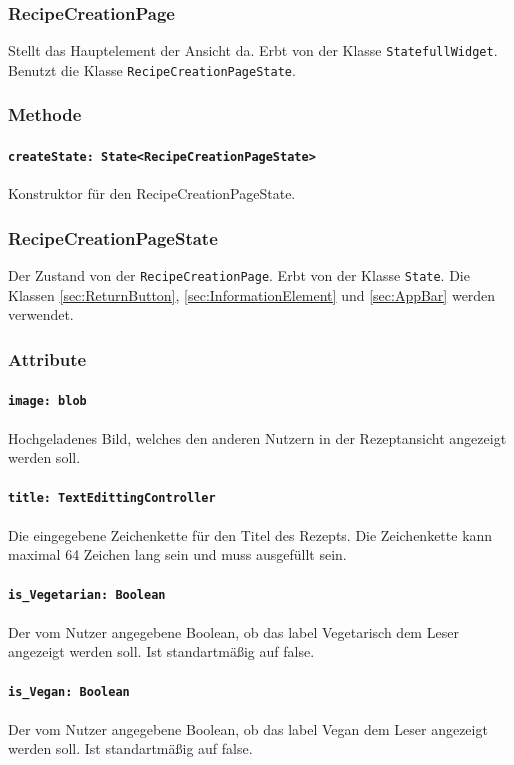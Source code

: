 \documentclass[parskip=full]{scrartcl}
\begin{document}
    \subsubsection{RecipeCreationPage}
    Stellt das Hauptelement der Ansicht da. Erbt von der Klasse \texttt{StatefullWidget}. Benutzt die Klasse \texttt{RecipeCreationPageState}.
        \subsubsection*{Methode}
            \paragraph*{\texttt{createState: State<RecipeCreationPageState>}} Konstruktor für den RecipeCreationPageState.

    \subsubsection{RecipeCreationPageState}
    Der Zustand von der \texttt{RecipeCreationPage}. Erbt von der Klasse \texttt{State}. Die Klassen \ref{sec:ReturnButton}, \ref{sec:InformationElement} und \ref{sec:AppBar} werden verwendet.
        \subsubsection*{Attribute}
            \paragraph*{\texttt{image: blob}} Hochgeladenes Bild, welches den anderen Nutzern in der Rezeptansicht angezeigt werden soll.
            \paragraph*{\texttt{title: TextEdittingController}} Die eingegebene Zeichenkette für den Titel des Rezepts. Die Zeichenkette kann maximal 64 Zeichen lang sein und muss ausgefüllt sein.
            \paragraph*{\texttt{is\_Vegetarian: Boolean}} Der vom Nutzer angegebene Boolean, ob das \gls{label} Vegetarisch dem Leser angezeigt werden soll. Ist standartmäßig auf false.
            \paragraph*{\texttt{is\_Vegan: Boolean}} Der vom Nutzer angegebene Boolean, ob das \gls{label} Vegan dem Leser angezeigt werden soll. Ist standartmäßig auf false.
\end{document}
